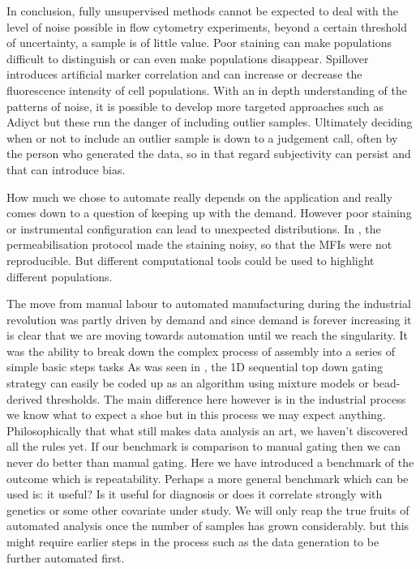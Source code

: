 In conclusion, fully unsupervised methods cannot be expected to deal with the level of noise possible in flow cytometry experiments, beyond a certain threshold of uncertainty, a sample is of little value.
Poor staining can make populations difficult to distinguish or can even make populations disappear.
Spillover introduces artificial marker correlation and can increase or decrease the fluorescence intensity of cell populations.  
With an in depth understanding of the patterns of noise, it is possible to develop more targeted approaches such as Adiyct but these run the danger of including outlier samples.
Ultimately deciding when or not to include an outlier sample is down to a judgement call, often by the person who generated the data, so in that regard subjectivity can persist and that can introduce bias.


How much we chose to automate really depends on the application and really comes down to a question of keeping up with the demand.
However poor staining or instrumental configuration can lead to unexpected distributions.
In , the permeabilisation protocol made the staining noisy, so that the MFIs were not reproducible.
But different computational tools could be used to highlight different populations.

The move from manual labour to automated manufacturing during the industrial revolution was partly driven by demand and since demand is forever increasing it is clear that we are moving towards automation until we reach the singularity.
It was the ability to break down the complex process of assembly into a series of simple basic steps tasks 
As was seen in , the 1D sequential top down gating strategy can easily be coded up as an algorithm using mixture models or bead-derived thresholds.  
The main difference here however is in the industrial process we know what to expect a shoe but in this process we may expect anything.
Philosophically that what still makes data analysis an art, we haven't discovered all the rules yet.
If our benchmark is comparison to manual gating then we can never do better than manual gating.
Here we have introduced a benchmark of the outcome which is repeatability.
Perhaps a more general benchmark which can be used is: it useful?
Is it useful for diagnosis or does it correlate strongly with genetics or some other covariate under study.
We will only reap the true fruits of automated analysis once the number of samples has grown considerably.
but this might require earlier steps in the process such as the data generation to be further automated first.



